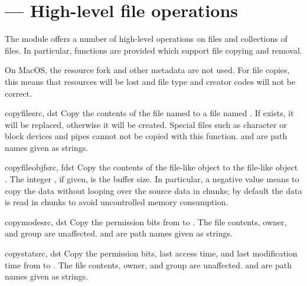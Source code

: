 \section{ ---
         High-level file operations}



The  module offers a number of high-level operations on
files and collections of files.  In particular, functions are provided 
which support file copying and removal.

  On MacOS, the resource fork and other metadata are
not used.  For file copies, this means that resources will be lost and 
file type and creator codes will not be correct.


\begin{funcdesc}{copyfile}{src, dst}
  Copy the contents of the file named  to a file named
  .  If  exists, it will be replaced, otherwise it
  will be created.  Special files such as character or block devices
  and pipes cannot not be copied with this function.   and
   are path names given as strings.
\end{funcdesc}

\begin{funcdesc}{copyfileobj}{fsrc, fdst}
  Copy the contents of the file-like object  to the
  file-like object .  The integer , if given,
  is the buffer size. In particular, a negative  value
  means to copy the data without looping over the source data in
  chunks; by default the data is read in chunks to avoid uncontrolled
  memory consumption.
\end{funcdesc}

\begin{funcdesc}{copymode}{src, dst}
  Copy the permission bits from  to .  The file
  contents, owner, and group are unaffected.   and 
  are path names given as strings.
\end{funcdesc}

\begin{funcdesc}{copystat}{src, dst}
  Copy the permission bits, last access time, and last modification
  time from  to .  The file contents, owner, and
  group are unaffected.   and  are path names given
  as strings.
\end{funcdesc}


